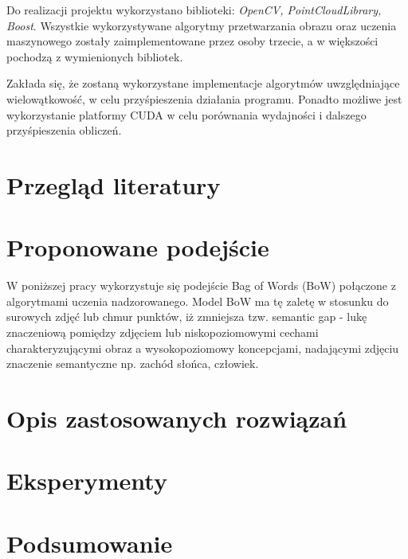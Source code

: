 \documentclass[a4paper,10pt,twocolumn]{article}
\begin{document}
  Do realizacji projektu wykorzystano biblioteki: \emph{OpenCV, PointCloudLibrary, Boost}. Wszystkie wykorzystywane algorytmy przetwarzania obrazu oraz uczenia maszynowego zostały zaimplementowane przez osoby trzecie, a w większości pochodzą z wymienionych bibliotek.
  
  Zakłada się, że zostaną wykorzystane implementacje algorytmów uwzględniające wielowątkowość, w celu przyśpieszenia działania programu. Ponadto możliwe jest wykorzystanie platformy CUDA w celu porównania wydajności i dalszego przyśpieszenia obliczeń.
 
\section{Przegląd literatury}

\section{Proponowane podejście}

	W poniższej pracy wykorzystuje się podejście Bag of Words (BoW) połączone z algorytmami uczenia nadzorowanego. Model BoW ma tę zaletę w stosunku do surowych zdjęć lub chmur punktów, iż zmniejsza tzw. semantic gap - lukę znaczeniową pomiędzy zdjęciem lub niskopoziomowymi cechami charakteryzującymi obraz a wysokopoziomowy koncepcjami, nadającymi zdjęciu znaczenie semantyczne np. zachód słońca, człowiek. 

\section{Opis zastosowanych rozwiązań}

\section{Eksperymenty}

\section{Podsumowanie}


\end{document}
